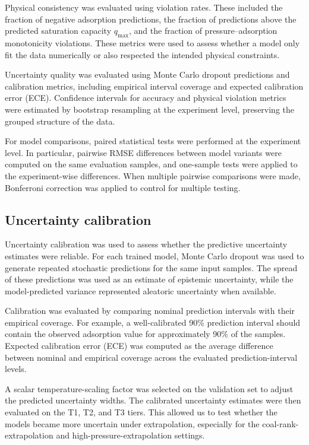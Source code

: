 \documentclass[11pt]{article}
\begin{document}
Physical consistency was evaluated using violation rates. These included the
fraction of negative adsorption predictions, the fraction of predictions above
the predicted saturation capacity \(q_{\max}\), and the fraction of
pressure--adsorption monotonicity violations. These metrics were used to assess
whether a model only fit the data numerically or also respected the intended
physical constraints.

Uncertainty quality was evaluated using Monte Carlo dropout predictions and
calibration metrics, including empirical interval coverage and expected
calibration error (ECE). Confidence intervals for accuracy and physical
violation metrics were estimated by bootstrap resampling at the experiment
level, preserving the grouped structure of the data.

For model comparisons, paired statistical tests were performed at the
experiment level. In particular, pairwise RMSE differences between model
variants were computed on the same evaluation samples, and one-sample tests
were applied to the experiment-wise differences. When multiple pairwise
comparisons were made, Bonferroni correction was applied to control for
multiple testing.



\subsection{Uncertainty calibration}

Uncertainty calibration was used to assess whether the predictive uncertainty
estimates were reliable. For each trained model, Monte Carlo dropout was used to
generate repeated stochastic predictions for the same input samples. The spread
of these predictions was used as an estimate of epistemic uncertainty, while
the model-predicted variance represented aleatoric uncertainty when available.

Calibration was evaluated by comparing nominal prediction intervals with their
empirical coverage. For example, a well-calibrated 90\% prediction interval
should contain the observed adsorption value for approximately 90\% of the
samples. Expected calibration error (ECE) was computed as the average difference
between nominal and empirical coverage across the evaluated prediction-interval
levels.

A scalar temperature-scaling factor was selected on the validation set to adjust
the predicted uncertainty widths. The calibrated uncertainty estimates were then
evaluated on the T1, T2, and T3 tiers. This allowed us to test whether the
models became more uncertain under extrapolation, especially for the
coal-rank-extrapolation and high-pressure-extrapolation settings.
\end{document}
